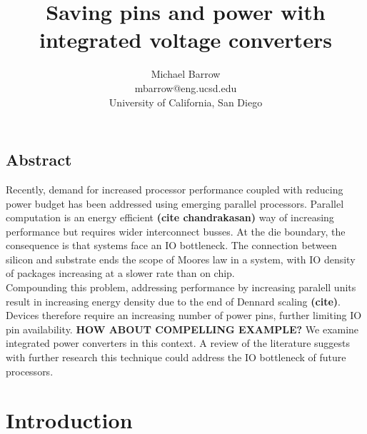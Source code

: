\documentclass[letterpaper,twocolumn,10pt]{article}
\begin{document}
\date{}

\title{\Large \bf Saving pins and power with integrated voltage converters}

\author{
{\rm Michael Barrow}\\
mbarrow@eng.ucsd.edu\\
University of California, San Diego
}

\maketitle

\thispagestyle{empty}


\subsection*{Abstract}
Recently, demand for increased processor performance coupled with reducing power budget has been addressed using emerging parallel processors. Parallel computation is an energy efficient \textbf{(cite chandrakasan)} way of increasing performance but requires wider interconnect busses. At the die boundary, the consequence is that systems face an IO bottleneck. The connection between silicon and substrate ends the scope of Moores law in a system, with IO density of packages increasing at a slower rate than on chip.\\
Compounding this problem, addressing performance by increasing paralell units result in increasing energy density due to the end of Dennard scaling \textbf{(cite)}. Devices therefore require an increasing number of power pins, further limiting IO pin availability. \textbf{HOW ABOUT COMPELLING EXAMPLE?}
We examine integrated power converters in this context. A review of the literature suggests with further research this technique could address the IO bottleneck of future processors.%

\section{Introduction}

\end{document}

